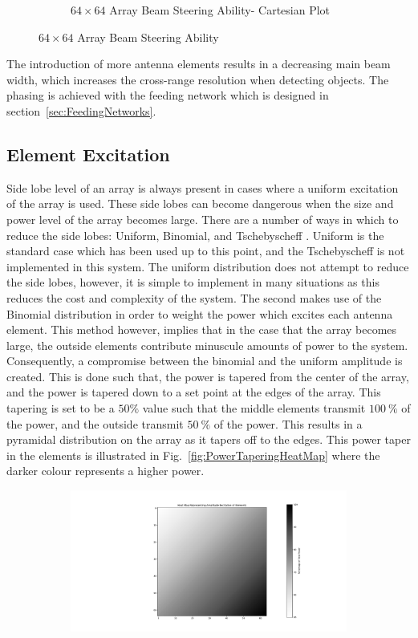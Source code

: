 \documentclass[11pt]{witseiepaper}
\begin{document}
\begin{bibunit}[witseie]
\begin{figure}[htb]
\begin{subfigure}{.5\textwidth}
            \caption{$64 \times 64$ Array Beam Steering Ability- Cartesian Plot}
                \label{fig:SteeringBig-Cartesian}
            \end{subfigure}
\caption{$64 \times 64$ Array Beam Steering Ability}
\label{fig:SteeringBig}
\end{figure}
The introduction of more antenna elements results in a decreasing main beam width, which increases the cross-range resolution when detecting objects\cite[p.~14,28,469]{radarHandbook}.
The phasing is achieved with the feeding network which is designed in section~\ref{sec:FeedingNetworks}.

\subsection{Element Excitation} \label{sec:ElementExcitation}
Side lobe level of an array is always present in cases where a uniform excitation of the array is used. These side lobes can become dangerous when the size and power level of the array becomes large.
There are a number of ways in which to reduce the side lobes: Uniform, Binomial, and Tschebyscheff \cite[p.~324-325]{Balanis}. Uniform is the standard case which has been used up to this point, and the Tschebyscheff is not implemented in this system. The uniform distribution does not attempt to reduce the side lobes, however, it is simple to implement in many situations as this reduces the cost and complexity of the system. The second makes use of the Binomial distribution in order to weight the power which excites each antenna element.
This method however, implies that in the case that the array becomes large, the outside elements contribute minuscule amounts of power to the system.
Consequently, a compromise between the binomial and the uniform amplitude is created.
This is done such that, the power is tapered from the center of the array, and the power is tapered down to a set point at the edges of the array. This tapering is set to be a $50 \%$ value such that the middle elements transmit $100~\%$ of the power, and the outside transmit $50~\%$ of the power. This results in a pyramidal distribution on the array as it tapers off to the edges.
This power taper in the elements is illustrated in Fig.~\ref{fig:PowerTaperingHeatMap} where the darker colour represents a higher power.
\begin{figure}[htb]
    \centering
    \begin{subfigure}{.5\textwidth}
        \centering
            \includegraphics[width=0.9\linewidth]{PowerTapering.pdf}

\end{subfigure}
\end{figure}
\end{bibunit}
\end{document}
